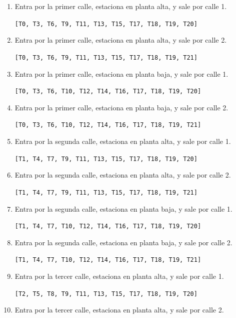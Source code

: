 \documentclass[12pt,a4paper]{article}
\begin{document}
\begin{enumerate}[leftmargin=1.5cm]
    \item Entra por la primer calle, estaciona en planta alta, y sale por calle 1.
    
    \verb|[T0, T3, T6, T9, T11, T13, T15, T17, T18, T19, T20]|
    
    \item Entra por la primer calle, estaciona en planta alta, y sale por calle 2.
    
    \verb|[T0, T3, T6, T9, T11, T13, T15, T17, T18, T19, T21]|
    
    \item Entra por la primer calle, estaciona en planta baja, y sale por calle 1.
    
    \verb|[T0, T3, T6, T10, T12, T14, T16, T17, T18, T19, T20]|
    
    \item Entra por la primer calle, estaciona en planta baja, y sale por calle 2.
    
    \verb|[T0, T3, T6, T10, T12, T14, T16, T17, T18, T19, T21]|
    
    \item Entra por la segunda calle, estaciona en planta alta, y sale por calle 1.
    
    \verb|[T1, T4, T7, T9, T11, T13, T15, T17, T18, T19, T20]|
    
    \item Entra por la segunda calle, estaciona en planta alta, y sale por calle 2.
    
    \verb|[T1, T4, T7, T9, T11, T13, T15, T17, T18, T19, T21]|
    
    \item Entra por la segunda calle, estaciona en planta baja, y sale por calle 1.
    
    \verb|[T1, T4, T7, T10, T12, T14, T16, T17, T18, T19, T20]|
    
    \item Entra por la segunda calle, estaciona en planta baja, y sale por calle 2.
    
    \verb|[T1, T4, T7, T10, T12, T14, T16, T17, T18, T19, T21]|
    
    \item Entra por la tercer calle, estaciona en planta alta, y sale por calle 1.
    
    \verb|[T2, T5, T8, T9, T11, T13, T15, T17, T18, T19, T20]|
    
    \item Entra por la tercer calle, estaciona en planta alta, y sale por calle 2.
    

\end{enumerate}
\end{document}
